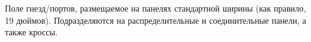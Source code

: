 Поле гнезд/портов, размещаемое на панелях стандартной ширины
(как правило, 19 дюймов). Подразделяются на распределительные и
соединительные панели, а также кроссы.